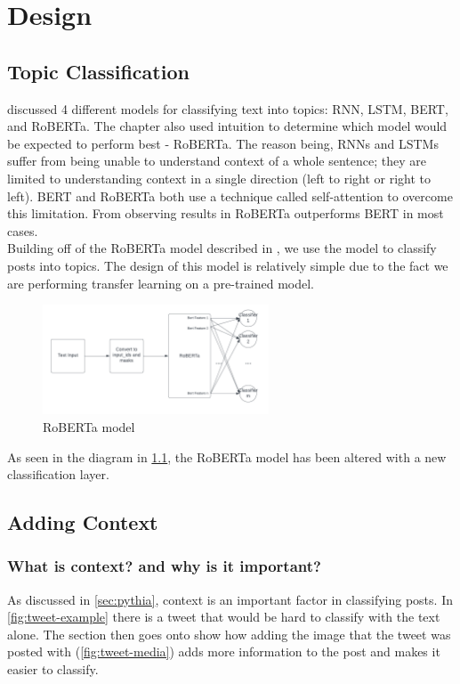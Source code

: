 \chapter{Design}
\label{ch:design}

\section{Topic Classification}
\label{sec:topic-classification}
 discussed 4 different models for classifying text into topics: RNN, LSTM, BERT, and RoBERTa.
The chapter also used intuition to determine which model would be expected to perform best - RoBERTa. The reason being,
RNNs and LSTMs suffer from being unable to understand context of a whole sentence; they are limited to understanding context
in a single direction (left to right or right to left). BERT and RoBERTa both use a technique called self-attention to overcome
this limitation. From observing results in \cite{DBLP:journals/corr/abs-1907-11692} RoBERTa outperforms BERT in most cases.\\
Building off of the RoBERTa model described in , we use the model to classify posts into topics.
The design of this model is relatively simple due to the fact we are performing transfer learning on a pre-trained model.
\newpage
\begin{figure}[hbtp]
    \centering
    \includegraphics[width=0.6\textwidth]{../images/classification-model.png}
    \caption{RoBERTa model}
    \label{fig:roberta}
\end{figure}

As seen in the diagram in \cref{fig:roberta}, the RoBERTa model has been altered with a new classification layer.

\section{Adding Context}
\subsection{What is context? and why is it important?}
As discussed in \cref{sec:pythia}, context is an important factor in classifying posts. In \cref{fig:tweet-example} there
is a tweet that would be hard to classify with the text alone. The section then goes onto show how adding the image that the tweet
was posted with (\cref{fig:tweet-media}) adds more information to the post and makes it easier to classify.
